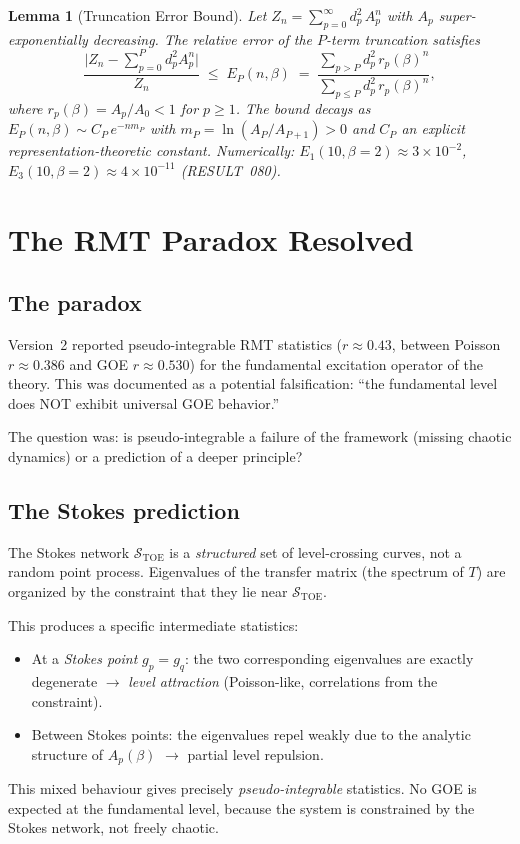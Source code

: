 \documentclass[12pt]{article}
\newtheorem{lemma}[theorem]{Lemma}
\theoremstyle{definition}
\theoremstyle{remark}
\newcommand{\TOE}{\mathrm{TOE}}
\begin{document}
\begin{lemma}[Truncation Error Bound]\label{lem:truncation}
Let $Z_n = \sum_{p=0}^\infty d_p^2\,A_p^n$ with $A_p$ super-exponentially decreasing.
The relative error of the $P$-term truncation satisfies
\[
\frac{\bigl|Z_n - \sum_{p=0}^P d_p^2 A_p^n\bigr|}{Z_n}
\;\leq\;
E_P(n,\beta)
\;=\;
\frac{\sum_{p>P} d_p^2\,r_p(\beta)^n}{\sum_{p\leq P} d_p^2\,r_p(\beta)^n},
\]
where $r_p(\beta) = A_p/A_0 < 1$ for $p \geq 1$.
The bound decays as $E_P(n,\beta) \sim C_P\,e^{-n m_P}$ with
$m_P = \ln(A_P/A_{P+1}) > 0$ and $C_P$ an explicit representation-theoretic
constant.  Numerically: $E_1(10, \beta{=}2) \approx 3\times 10^{-2}$,
$E_3(10, \beta{=}2) \approx 4\times 10^{-11}$ (RESULT~080).
\end{lemma}

\section{The RMT Paradox Resolved}
\label{sec:rmt}

\subsection{The paradox}

Version~2 reported pseudo-integrable RMT statistics
($r\approx 0.43$, between Poisson $r\approx 0.386$ and GOE $r\approx 0.530$)
for the fundamental excitation operator of the theory.
This was documented as a potential falsification:
``the fundamental level does NOT exhibit universal GOE behavior.''

The question was: is pseudo-integrable a failure of the framework
(missing chaotic dynamics) or a prediction of a deeper principle?

\subsection{The Stokes prediction}

The Stokes network $\mathcal{S}_\TOE$ is a \emph{structured} set of
level-crossing curves, not a random point process.
Eigenvalues of the transfer matrix (the spectrum of $T$) are organized
by the constraint that they lie near $\mathcal{S}_\TOE$.

This produces a specific intermediate statistics:
\begin{itemize}
\item At a \emph{Stokes point} $g_p = g_q$: the two corresponding
  eigenvalues are exactly degenerate $\to$ \emph{level attraction}
  (Poisson-like, correlations from the constraint).
\item Between Stokes points: the eigenvalues repel weakly due to
  the analytic structure of $A_p(\beta)$ $\to$ partial level repulsion.
\end{itemize}
This mixed behaviour gives precisely \emph{pseudo-integrable} statistics.
No GOE is expected at the fundamental level, because the system is
constrained by the Stokes network, not freely chaotic.
\end{document}
